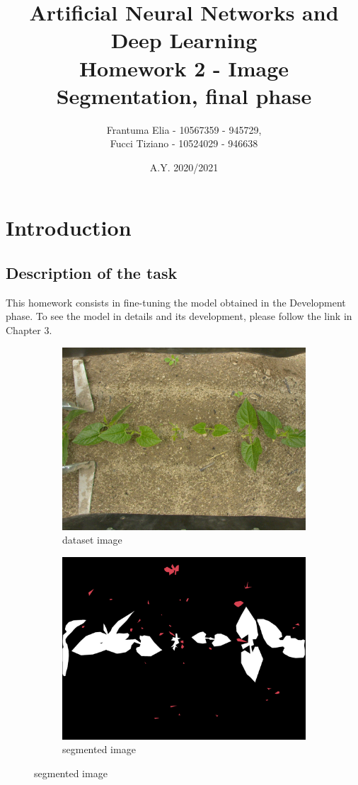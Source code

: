 \documentclass[12pt,a4paper]{report}
\title{Artificial Neural Networks and Deep Learning \\ Homework 2 - Image Segmentation, final phase}
\author{Frantuma Elia - 10567359 - 945729, \\
		Fucci Tiziano - 10524029 - 946638}
\date{A.Y. 2020/2021}
\begin{document}
	\maketitle
	\tableofcontents
	\chapter{Introduction}
		\section{Description of the task}
			This homework consists in fine-tuning the model obtained in the Development phase. To see the model in details and its development, please follow the link in Chapter 3.

\begin{figure}[H]
\renewcommand*\thesubfigure{\arabic{subfigure}} 
\centering
\begin{subfigure}{.45\textwidth}
  \centering
  \includegraphics[width=1\linewidth]{image0}
  \caption{dataset image}
  \label{fig:sub1}
\end{subfigure}
\begin{subfigure}{.45\textwidth}
  \centering
  \includegraphics[width=1\linewidth]{image1}
  \caption{segmented image}
  \label{fig:sub2}
\end{subfigure}
\end{figure}
\end{document}
